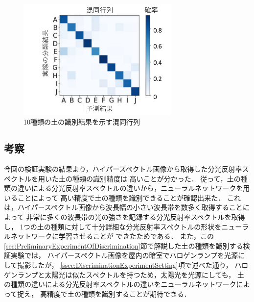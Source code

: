 \begin{figure}[b]
	\begin{center}
	\centering
	\includegraphics[width=8cm]{./Ch3_SoilTypeDiscrimination/Fig/confusion_matrix_compressed.pdf}
	\caption{10種類の土の識別結果を示す混同行列}\label{fig:discrimination_confusion_matrix}
	\end{center}
\end{figure}

\clearpage

\subsection{考察}
\label{ssec:DiscriminationConsideration}

今回の検証実験の結果より，ハイパースペクトル画像から取得した分光反射率スペクトルを用いた土の種類の識別精度は
高いことが分かった．
従って，土の種類の違いによる分光反射率スペクトルの違いから，ニューラルネットワークを用いることによって
高い精度で土の種類を識別できることが確認出来た．
これは，ハイパースペクトル画像から波長幅の小さい波長帯を数多く取得することによって
非常に多くの波長帯の光の強さを記録する分光反射率スペクトルを取得し，
1つの土の種類に対して十分詳細な分光反射率スペクトルの形状をニューラルネットワークに学習させることが
できたためである．
また，この\ref{sec:PreliminaryExperimentOfDiscrimination}節で解説した土の種類を識別する検証実験では，
ハイパースペクトル画像を屋内の暗室でハロゲンランプを光源にして撮影したが，
\ref{ssec:DiscriminationExperimentSetting}項で述べた通り，
ハロゲンランプと太陽光は似たスペクトルを持つため，太陽光を光源にしても，
土の種類の違いによる分光反射率スペクトルの違いをニューラルネットワークによって捉え，
高精度で土の種類を識別することが期待できる．




